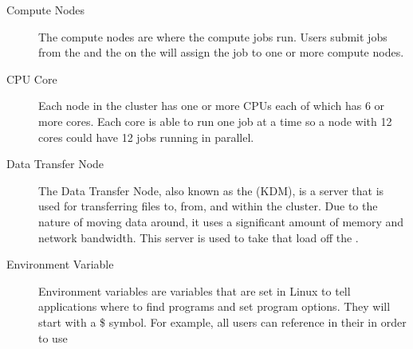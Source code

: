 \documentclass[letterpaper,10pt,english]{sphinxmanual}
\begin{document}
\begin{description}
\item[{Compute Nodes\label{\detokenize{glossary:term-Compute-Nodes}}}] \leavevmode
The compute nodes are where the compute jobs run. Users submit jobs from the {\hyperref[\detokenize{glossary:term-Login-Node}]{}} and the {\hyperref[\detokenize{glossary:term-Job-Scheduler}]{}} on the {\hyperref[\detokenize{glossary:term-Head-Node}]{}} will assign the job to one or more compute nodes.

\item[{CPU Core\label{\detokenize{glossary:term-CPU-Core}}}] \leavevmode
Each node in the cluster has one or more CPUs each of which has 6 or more cores. Each core is able to run one job at a time so a node with 12 cores could have 12 jobs running in parallel.

\item[{Data Transfer Node\label{\detokenize{glossary:term-Data-Transfer-Node}}}] \leavevmode
The Data Transfer Node, also known as the {\hyperref[\detokenize{storage/kdm:katana-data-mover}]{}} (KDM), is a server that is used for transferring files to, from, and within the cluster. Due to the nature of moving data around, it uses a significant amount of memory and network bandwidth. This server is used to take that load off the {\hyperref[\detokenize{glossary:term-Login-Node}]{}}.

\item[{Environment Variable\label{\detokenize{glossary:term-Environment-Variable}}}] \leavevmode
Environment variables are variables that are set in Linux to tell applications where to find programs and set program options. They will start with a \$ symbol. For example, all users can reference  in their {\hyperref[\detokenize{glossary:term-Job-Script}]{}} in order to use {\hyperref[\detokenize{glossary:term-Local-Scratch}]{}}


\end{description}
\end{document}
